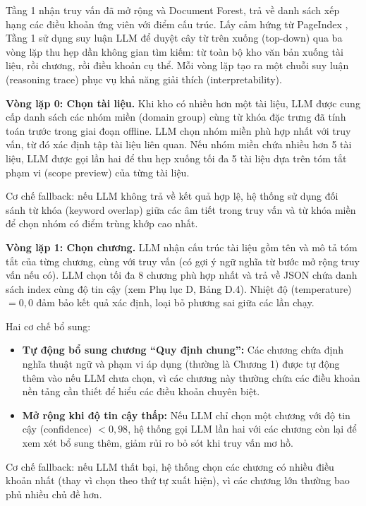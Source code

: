 Tầng 1 nhận truy vấn đã mở rộng và Document Forest, trả về danh sách xếp hạng
các điều khoản ứng viên với điểm cấu trúc. Lấy cảm hứng từ PageIndex
\cite{zhang2025pageindex}, Tầng 1 sử dụng suy luận LLM để duyệt cây từ trên xuống
(top-down) qua ba vòng lặp thu hẹp dần không gian tìm kiếm: từ toàn bộ kho văn
bản xuống tài liệu, rồi chương, rồi điều khoản cụ thể. Mỗi vòng lặp tạo ra một
chuỗi suy luận (reasoning trace) phục vụ khả năng giải thích (interpretability).

\textbf{Vòng lặp 0: Chọn tài liệu.}
Khi kho có nhiều hơn một tài liệu, LLM được cung cấp danh sách các nhóm miền
(domain group) cùng từ khóa đặc trưng đã tính toán trước trong giai đoạn offline.
LLM chọn nhóm miền phù hợp nhất với truy vấn, từ đó xác định tập tài liệu liên
quan. Nếu nhóm miền chứa nhiều hơn 5 tài liệu, LLM được gọi lần hai để thu hẹp
xuống tối đa 5 tài liệu dựa trên tóm tắt phạm vi (scope preview) của từng tài
liệu.

Cơ chế fallback: nếu LLM không trả về kết quả hợp lệ, hệ thống sử dụng đối sánh
từ khóa (keyword overlap) giữa các âm tiết trong truy vấn và từ khóa miền để chọn
nhóm có điểm trùng khớp cao nhất.

\textbf{Vòng lặp 1: Chọn chương.}
LLM nhận cấu trúc tài liệu gồm tên và mô tả tóm tắt của từng chương, cùng với
truy vấn (có gợi ý ngữ nghĩa từ bước mở rộng truy vấn nếu có). LLM chọn tối đa 8
chương phù hợp nhất và trả về JSON chứa danh sách index cùng độ tin cậy (xem Phụ
lục D, Bảng D.4). Nhiệt độ (temperature) $= 0{,}0$ đảm bảo kết quả xác định, loại
bỏ phương sai giữa các lần chạy.

Hai cơ chế bổ sung:
\begin{itemize}
  \item \textbf{Tự động bổ sung chương ``Quy định chung'':} Các chương chứa định
        nghĩa thuật ngữ và phạm vi áp dụng (thường là Chương 1) được tự động thêm
        vào nếu LLM chưa chọn, vì các chương này thường chứa các điều khoản nền
        tảng cần thiết để hiểu các điều khoản chuyên biệt.

  \item \textbf{Mở rộng khi độ tin cậy thấp:} Nếu LLM chỉ chọn một chương với
        độ tin cậy (confidence) $< 0{,}98$, hệ thống gọi LLM lần hai với các
        chương còn lại để xem xét bổ sung thêm, giảm rủi ro bỏ sót khi truy vấn
        mơ hồ.
\end{itemize}

Cơ chế fallback: nếu LLM thất bại, hệ thống chọn các chương có nhiều điều khoản
nhất (thay vì chọn theo thứ tự xuất hiện), vì các chương lớn thường bao phủ nhiều
chủ đề hơn.

